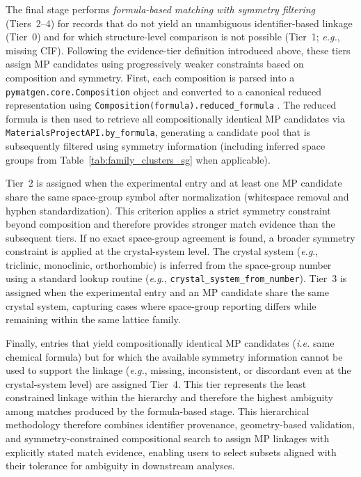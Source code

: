 \documentclass[a4paper,fleqn]{cas-sc}
\begin{document}

The final stage performs \emph{formula-based matching with symmetry filtering} (Tiers~2--4) for records that do not yield an unambiguous identifier-based linkage (Tier~0) and for which structure-level comparison is not possible (Tier~1; \textit{e.g.}, missing CIF). Following the evidence-tier definition introduced above, these tiers assign MP candidates using progressively weaker constraints based on composition and symmetry. First, each composition is parsed into a \texttt{pymatgen.core.Composition} object and converted to a canonical reduced representation using \texttt{Composition(formula).reduced\_formula} \cite{ong2013python}. The reduced formula is then used to retrieve all compositionally identical MP candidates via \texttt{MaterialsProjectAPI.by\_formula}, generating a candidate pool that is subsequently filtered using symmetry information (including inferred space groups from Table~\ref{tab:family_clusters_sg} when applicable).

Tier~2 is assigned when the experimental entry and at least one MP candidate share the same space-group symbol after normalization (whitespace removal and hyphen standardization). This criterion applies a strict symmetry constraint beyond composition and therefore provides stronger match evidence than the subsequent tiers. If no exact space-group agreement is found, a broader symmetry constraint is applied at the crystal-system level. The crystal system (\textit{e.g}., triclinic, monoclinic, orthorhombic) is inferred from the space-group number using a standard lookup routine (\textit{e.g.}, \texttt{crystal\_system\_from\_number}). Tier~3 is assigned when the experimental entry and an MP candidate share the same crystal system, capturing cases where space-group reporting differs while remaining within the same lattice family.

Finally, entries that yield compositionally identical MP candidates (\textit{i.e.} same chemical formula) but for which the available symmetry information cannot be used to support the linkage (\textit{e.g.}, missing, inconsistent, or discordant even at the crystal-system level) are assigned Tier~4. This tier represents the least constrained linkage within the hierarchy and therefore the highest ambiguity among matches produced by the formula-based stage. This hierarchical methodology therefore combines identifier provenance, geometry-based validation, and symmetry-constrained compositional search to assign MP linkages with explicitly stated match evidence, enabling users to select subsets aligned with their tolerance for ambiguity in downstream analyses.
\end{document}
